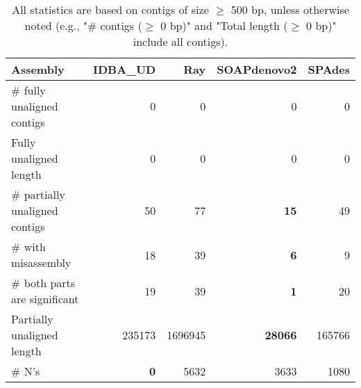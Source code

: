 \documentclass[12pt,a4paper]{article}
\begin{document}
\begin{table}[ht]
\begin{center}
\caption{All statistics are based on contigs of size $\geq$ 500 bp, unless otherwise noted (e.g., "\# contigs ($\geq$ 0 bp)" and "Total length ($\geq$ 0 bp)" include all contigs).}
\begin{tabular}{|l*{4}{|r}|}
\hline
Assembly & IDBA\_UD & Ray & SOAPdenovo2 & SPAdes \\ \hline
\# fully unaligned contigs & 0 & 0 & 0 & 0 \\ \hline
Fully unaligned length & 0 & 0 & 0 & 0 \\ \hline
\# partially unaligned contigs & 50 & 77 & {\bf 15} & 49 \\ \hline
\hspace{5mm}\# with misassembly & 18 & 39 & {\bf 6} & 9 \\ \hline
\hspace{5mm}\# both parts are significant & 19 & 39 & {\bf 1} & 20 \\ \hline
Partially unaligned length & 235173 & 1696945 & {\bf 28066} & 165766 \\ \hline
\# N's & {\bf 0} & 5632 & 3633 & 1080 \\ \hline
\end{tabular}
\end{center}
\end{table}
\end{document}
